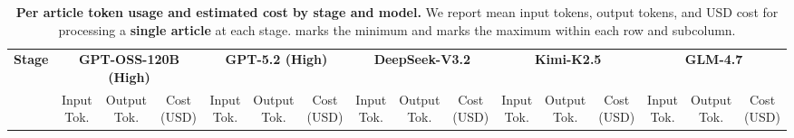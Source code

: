 



\begin{table}[h]
\centering
\caption{
\textbf{Per article token usage and estimated cost by stage and model.}
We report mean input tokens, output tokens, and USD cost for processing a \textbf{single article} at each stage.
 marks the minimum and  marks the maximum within each row and subcolumn.
}
\label{tab:token_usage_by_stage}
\setlength{\tabcolsep}{1.3pt}
\renewcommand{\arraystretch}{1.2}
{\footnotesize
\begin{tabular}{l|ccc|ccc|ccc|ccc|ccc}
\toprule
\textbf{Stage} & \multicolumn{3}{c|}{\textbf{GPT-OSS-120B (High)}} & \multicolumn{3}{c|}{\textbf{GPT-5.2 (High)}} & \multicolumn{3}{c|}{\textbf{DeepSeek-V3.2}} & \multicolumn{3}{c|}{\textbf{Kimi-K2.5}} & \multicolumn{3}{c}{\textbf{GLM-4.7}} \\
 & \makecell[c]{Input\\Tok.} & \makecell[c]{Output\\Tok.} & \makecell[c]{Cost\\(USD)} & \makecell[c]{Input\\Tok.} & \makecell[c]{Output\\Tok.} & \makecell[c]{Cost\\(USD)} & \makecell[c]{Input\\Tok.} & \makecell[c]{Output\\Tok.} & \makecell[c]{Cost\\(USD)} & \makecell[c]{Input\\Tok.} & \makecell[c]{Output\\Tok.} & \makecell[c]{Cost\\(USD)} & \makecell[c]{Input\\Tok.} & \makecell[c]{Output\\Tok.} & \makecell[c]{Cost\\(USD)} \\

\end{tabular}}
\end{table}
